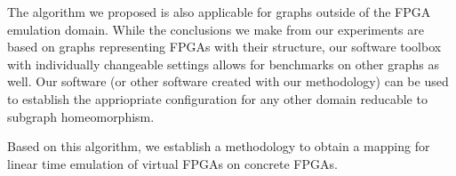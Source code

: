 The algorithm we proposed is also applicable for graphs outside of the FPGA emulation domain. While the conclusions we make from our experiments are based on graphs representing FPGAs with their structure, our software toolbox with individually changeable settings allows for benchmarks on other graphs as well. Our software (or other software created with our methodology) can be used to establish the appriopriate configuration for any other domain reducable to subgraph homeomorphism.

Based on this algorithm, we establish a methodology to obtain a mapping for linear time emulation of virtual FPGAs on concrete FPGAs.